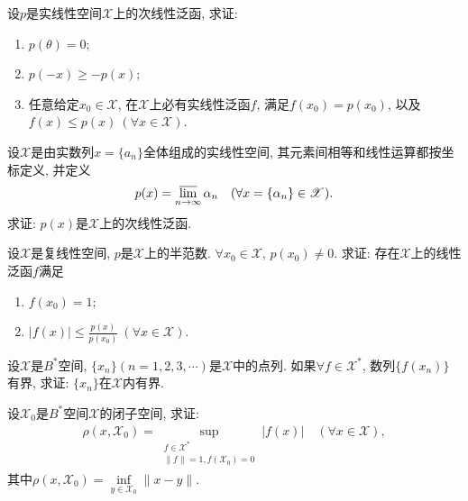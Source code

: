 \documentclass[../../main.tex]{subfiles}%
\begin{document}
\begin{example}
设$p$是实线性空间$\mathscr{X}$上的次线性泛函, 求证:
\begin{enumerate}[(1)]
\item $p(\theta) = 0$;
\item $p(-x) \geqslant -p(x)$;
\item 任意给定$x_0 \in \mathscr{X}$, 在$\mathscr{X}$上必有实线性泛函$f$, 满足$f(x_0) = p(x_0)$, 以及$f(x) \leqslant p(x) \ (\forall x \in \mathscr{X})$.
\end{enumerate}
\end{example}

\begin{example}
设$\mathscr{X}$是由实数列$x = \{a_n\}$全体组成的实线性空间, 其元素间相等和线性运算都按坐标定义, 并定义
\begin{align*}
p(x) = \varlimsup\limits_{n\to\infty} \alpha_n \quad (\forall x = \{\alpha_n\} \in \mathscr{X}).
\end{align*}
求证: $p(x)$是$\mathscr{X}$上的次线性泛函.
\end{example}

\begin{example}
设$\mathscr{X}$是复线性空间, $p$是$\mathscr{X}$上的半范数. $\forall x_0 \in \mathscr{X}$, $p(x_0) \neq 0$. 求证: 存在$\mathscr{X}$上的线性泛函$f$满足
\begin{enumerate}[(1)]
\item $f(x_0) = 1$;
\item $|f(x)| \leqslant \frac{p(x)}{p(x_0)} \ (\forall x \in \mathscr{X})$.
\end{enumerate}
\end{example}

\begin{example}
设$\mathscr{X}$是$B^*$空间, $\{x_n\}(n=1,2,3,\cdots)$是$\mathscr{X}$中的点列. 如果$\forall f \in \mathscr{X}^*$, 数列$\{f(x_n)\}$有界, 求证: $\{x_n\}$在$\mathscr{X}$内有界.
\end{example}

\begin{example}
设$\mathscr{X}_0$是$B^*$空间$\mathscr{X}$的闭子空间, 求证:
\begin{align*}
\rho(x, \mathscr{X}_0) = \sup\limits_{\substack{f \in \mathscr{X}^* \\ \|f\| = 1, f(\mathscr{X}_0) = 0}} |f(x)| \quad (\forall x \in \mathscr{X}),
\end{align*}
其中$\rho(x, \mathscr{X}_0) = \inf\limits_{y \in \mathscr{X}_0} \|x - y\|$.
\end{example}
\end{document}

